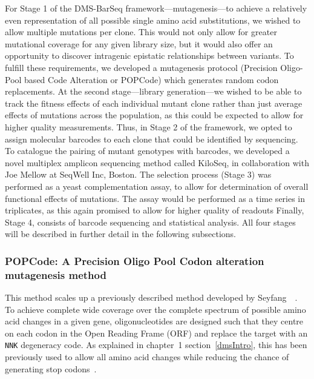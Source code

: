 For Stage 1 of the DMS-BarSeq framework---mutagenesis---to achieve a relatively even representation of all possible single amino acid substitutions, we wished to allow multiple mutations per clone. This would not only allow for greater mutational coverage for any given library size, but it would also offer an opportunity to discover intragenic epistatic relationships between variants.  To fulfill these requirements, we developed a mutagenesis protocol (Precision Oligo-Pool based Code Alteration or POPCode) which generates random codon replacements. 
At the second stage---library generation---we wished to be able to track the fitness effects of each individual mutant clone rather than just average effects of mutations across the population, as this could be expected to allow for higher quality measurements. Thus, in Stage 2 of the framework, we opted to assign molecular barcodes to each clone that could be identified by sequencing. To catalogue the pairing of mutant genotypes with barcodes, we developed a novel multiplex amplicon sequencing method called KiloSeq, in collaboration with Joe Mellow at SeqWell Inc, Boston. 
The selection process (Stage 3) was performed as a yeast complementation assay, to allow for determination of overall functional effects of mutations. The assay would be performed as a time series in triplicates, as this again promised to allow for higher quality of readouts 
Finally, Stage 4, consists of barcode sequencing and statistical analysis. All four stages will be described in further detail in the following subsections.


\subsubsection{POPCode: A Precision Oligo Pool Codon alteration mutagenesis method}

This method scales up a previously described method developed by Seyfang~\etal~\cite{seyfang_multiple_2004}. To achieve complete wide coverage over the complete spectrum of possible amino acid changes in a given gene, oligonucleotides are designed such that they centre on each codon in the Open Reading Frame (ORF) and replace the target with an \texttt{NNK} degeneracy code. As explained in chapter~1 section~\ref{dmsIntro}, this has been previously used to allow all amino acid changes while reducing the chance of generating stop codons~\cite{pal_methods_2005}. 

